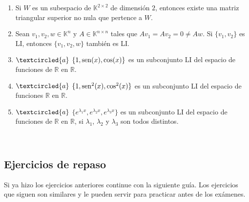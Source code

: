 \documentclass[12pt]{amsart}
\begin{document}
\begin{enumerate}
\begin{enumerate}
  \item Si $W$ es un subespacio de $\mathbb{K}^{2\times2}$ de dimensi\'on $2$, entonces existe una matriz triangular superior no nula que pertence a $W$.

 \item Sean $v_1, v_2, w\in \mathbb{K}^{n}$ y $A\in\mathbb{K}^{n\times n}$ tales que $Av_1=Av_2=0\neq Aw$. Si $\{v_1, v_2\}$ es LI, entonces $\{v_1,v_2,w\}$ tambi\'en es LI.

\item\label{cos} $\textcircled{a}$ $\{1,{\rm sen}(x),\cos(x)\}$ es un subconjunto LI del espacio de funciones de $\mathbb{R}$ en $\mathbb{R}$.

\item\label{cos2} $\textcircled{a}$ $\{1,{\rm sen}^2(x),\cos^2(x)\}$ es un subconjunto LI del espacio de funciones $\mathbb{R}$ en $\mathbb{R}$.

\item\label{exponencial} $\textcircled{a}$ $\{e^{\lambda_1x},e^{\lambda_2x},e^{\lambda_3x}\}$ es un subconjunto LI del espacio de funciones de
$\mathbb{R}$ en $\mathbb{R}$, si $\lambda_1$, $\lambda_2$ y $\lambda_3$ son todos distintos.
\end{enumerate}

%



\end{enumerate}

\

\subsection*{Ejercicios de repaso}
Si ya hizo los ejercicios anteriores continue con la siguiente gu\'ia. Los ejercicios que siguen son similares y le pueden servir para practicar antes de los ex\'amenes.

\
\end{document}
